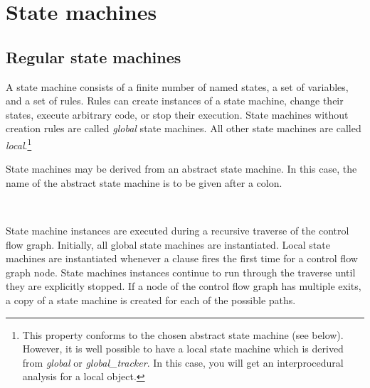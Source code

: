 \chapter{State machines}

\section{Regular state machines}

A state machine consists of a finite number of named states, a set of
variables, and a set of rules. Rules can create instances of a state machine,
change their states, execute arbitrary code, or stop their execution.
State machines without creation rules are called \textit{global}
state machines. All other state machines are
called \textit{local}.\footnote{This property
conforms to the chosen abstract state machine (see below). However,
it is well possible to have a local state machine which is derived from
\textit{global} or \textit{global\_tracker}. In this case, you will get
an interprocedural analysis for a local object.}

State machines may be derived from an abstract state machine. In this
case, the name of the abstract state machine is to be given after a
colon.

\begin{grammar}
      \produces {}  
	 \lextoken{(}
	  \lextoken{)} \nextline
	 \lextoken{\{}  
	 \lextoken{\}} \\
      \produces {} 
	  \lextoken{:} 
	 \lextoken{(}  \lextoken{)} \nextline
	 \lextoken{\{}  
	 \lextoken{\}}
\end{grammar}%

\noindent
State machine instances are executed during a recursive traverse
of the control flow graph. Initially, all global state machines
are instantiated. Local state machines are instantiated whenever a
 clause fires the first time for a control flow graph
node. State machines instances continue to run through the traverse
until they are explicitly stopped. If a node of the control flow graph
has multiple exits, a copy of a state machine is created for each of
the possible paths.

